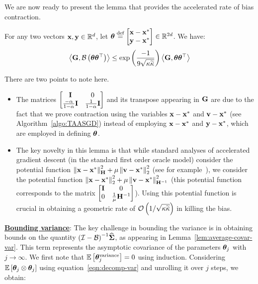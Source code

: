 We are now ready to present the lemma that provides the accelerated rate of bias contraction.
\begin{lemma} \label{lem:main-bias}
	For any two vectors $\x, \y \in \R^d$, let $\thetav \eqdef \begin{bmatrix}
	\x-\xs \\ \y-\xs
	\end{bmatrix} \in \R^{2d}$. We have: 
	\begin{align*}
	\iprod{\G}{\B \left(\thetav \thetav \T\right)} \leq \exp\left(\frac{-1}{9\sqrt{\cnH\cnS}}\right) \iprod{\G}{\thetav \thetav \T}
	\end{align*}
\end{lemma}
There are two points to note here. 
\begin{itemize}
\item The matrices $\begin{bmatrix} \Id &\zero \\ \frac{-\alpha}{1-\alpha}\Id & \frac{1}{1-\alpha}\Id \end{bmatrix}$ and its transpose appearing in $\G$ are due to the fact that we prove contraction using the variables $\x-\xs$ and $\v-\xs$ (see Algorithm~\ref{algo:TAASGD}) instead of employing $\x-\xs$ and $\y-\xs$, which are employed in defining $\thetav$. 
\item The key novelty in this lemma is that while standard analyses of accelerated gradient descent (in the standard first order oracle model) consider the potential function $\norm{\x-\xs}_{\Cov}^2 + \mu \twonorm{\v - \xs}^2$ (see for example~\cite{WilsonRJ16}), we consider the potential function $\twonorm{\x-\xs}^2 + \mu \norm{\v - \xs}_{\inv{\Cov}}^2$ (this potential function corresponds to the matrix $\begin{bmatrix} \Id &\zero \\ \zero & \frac{1}{\mu}\inv{\Cov} \end{bmatrix}$). Using this potential function is crucial in obtaining a geometric rate of $\order{1/\sqrt{\cnH\cnS}}$ in killing the bias.
\end{itemize}
\noindent \underline{\textbf{Bounding variance}}: The key challenge in bounding the variance is in obtaining bounds on the quantity $\inv{\left(\eyeT-\B\right)}\Sigh$, as appearing in Lemma~\ref{lem:average-covar-var}. This term represents the asymptotic covariance of the parameters $\thetat[j]$ with $j\to\infty$. We first note that $\E{\thetat[j]^{\textrm{variance}}}=\zero$ using induction. Considering $\E{\thetat[j]\otimes\thetat[j]}$ using equation~\ref{eqn:decomp-var} and unrolling it over $j$ steps, we obtain: %
